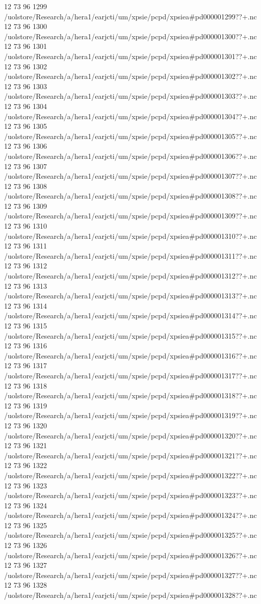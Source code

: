 12 73 96
1299
/uolstore/Research/a/hera1/earjcti/um/xpsie/pcpd/xpsiea#pd000001299??+.nc
12 73 96
1300
/uolstore/Research/a/hera1/earjcti/um/xpsie/pcpd/xpsiea#pd000001300??+.nc
12 73 96
1301
/uolstore/Research/a/hera1/earjcti/um/xpsie/pcpd/xpsiea#pd000001301??+.nc
12 73 96
1302
/uolstore/Research/a/hera1/earjcti/um/xpsie/pcpd/xpsiea#pd000001302??+.nc
12 73 96
1303
/uolstore/Research/a/hera1/earjcti/um/xpsie/pcpd/xpsiea#pd000001303??+.nc
12 73 96
1304
/uolstore/Research/a/hera1/earjcti/um/xpsie/pcpd/xpsiea#pd000001304??+.nc
12 73 96
1305
/uolstore/Research/a/hera1/earjcti/um/xpsie/pcpd/xpsiea#pd000001305??+.nc
12 73 96
1306
/uolstore/Research/a/hera1/earjcti/um/xpsie/pcpd/xpsiea#pd000001306??+.nc
12 73 96
1307
/uolstore/Research/a/hera1/earjcti/um/xpsie/pcpd/xpsiea#pd000001307??+.nc
12 73 96
1308
/uolstore/Research/a/hera1/earjcti/um/xpsie/pcpd/xpsiea#pd000001308??+.nc
12 73 96
1309
/uolstore/Research/a/hera1/earjcti/um/xpsie/pcpd/xpsiea#pd000001309??+.nc
12 73 96
1310
/uolstore/Research/a/hera1/earjcti/um/xpsie/pcpd/xpsiea#pd000001310??+.nc
12 73 96
1311
/uolstore/Research/a/hera1/earjcti/um/xpsie/pcpd/xpsiea#pd000001311??+.nc
12 73 96
1312
/uolstore/Research/a/hera1/earjcti/um/xpsie/pcpd/xpsiea#pd000001312??+.nc
12 73 96
1313
/uolstore/Research/a/hera1/earjcti/um/xpsie/pcpd/xpsiea#pd000001313??+.nc
12 73 96
1314
/uolstore/Research/a/hera1/earjcti/um/xpsie/pcpd/xpsiea#pd000001314??+.nc
12 73 96
1315
/uolstore/Research/a/hera1/earjcti/um/xpsie/pcpd/xpsiea#pd000001315??+.nc
12 73 96
1316
/uolstore/Research/a/hera1/earjcti/um/xpsie/pcpd/xpsiea#pd000001316??+.nc
12 73 96
1317
/uolstore/Research/a/hera1/earjcti/um/xpsie/pcpd/xpsiea#pd000001317??+.nc
12 73 96
1318
/uolstore/Research/a/hera1/earjcti/um/xpsie/pcpd/xpsiea#pd000001318??+.nc
12 73 96
1319
/uolstore/Research/a/hera1/earjcti/um/xpsie/pcpd/xpsiea#pd000001319??+.nc
12 73 96
1320
/uolstore/Research/a/hera1/earjcti/um/xpsie/pcpd/xpsiea#pd000001320??+.nc
12 73 96
1321
/uolstore/Research/a/hera1/earjcti/um/xpsie/pcpd/xpsiea#pd000001321??+.nc
12 73 96
1322
/uolstore/Research/a/hera1/earjcti/um/xpsie/pcpd/xpsiea#pd000001322??+.nc
12 73 96
1323
/uolstore/Research/a/hera1/earjcti/um/xpsie/pcpd/xpsiea#pd000001323??+.nc
12 73 96
1324
/uolstore/Research/a/hera1/earjcti/um/xpsie/pcpd/xpsiea#pd000001324??+.nc
12 73 96
1325
/uolstore/Research/a/hera1/earjcti/um/xpsie/pcpd/xpsiea#pd000001325??+.nc
12 73 96
1326
/uolstore/Research/a/hera1/earjcti/um/xpsie/pcpd/xpsiea#pd000001326??+.nc
12 73 96
1327
/uolstore/Research/a/hera1/earjcti/um/xpsie/pcpd/xpsiea#pd000001327??+.nc
12 73 96
1328
/uolstore/Research/a/hera1/earjcti/um/xpsie/pcpd/xpsiea#pd000001328??+.nc
